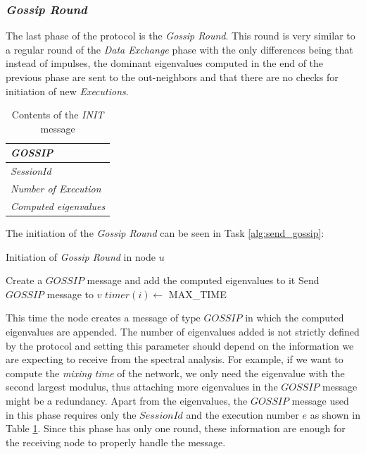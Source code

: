 \documentclass[a4paper,11pt,twoside]{report}
\begin{document}
\subsubsection*{\textit{Gossip Round}}

The last phase of the protocol is the \textit{Gossip Round}. This round is very similar to a regular round of the \textit{Data Exchange} phase with the only differences being that instead of impulses, the dominant eigenvalues computed in the end of the previous phase are sent to the out-neighbors and that there are no checks for initiation of new \textit{Executions}.

\begin{table}
	 \centering
	     	     \begin{tabular}{|l|}
	     	     	   	\hline
	     	     	   \textbf{\textit{GOSSIP}}\\
	     	     	   	\hline
	     	     	   	\hline
	     	     	   	 \textit{SessionId}\\
	     	     	     \textit{Number of Execution}\\
	     	     	     \textit{Computed eigenvalues}\\
	     	     	       \hline
	     	     	     	\end{tabular}
\caption{Contents of the \textit{INIT} message}
		     	   \label{table:gossip_msg}
\end{table}	

\noindent The initiation of the \textit{Gossip Round} can be seen in Task \ref{alg:send_gossip}:

\begin{algorithm}
 		\caption{Initiation of \textit{Gossip Round} in node $u$}
 		\label{alg:send_gossip}
 		\begin{algorithmic}[1]
 		\STATE Create a $GOSSIP$ message and add the computed eigenvalues to it
 		\STATE Send $GOSSIP$ message to $v$
 		\ENDFOR
 		\STATE $timer(i) \leftarrow$ MAX\_TIME
 		\ENDFOR
 		\end{algorithmic}
 	\end{algorithm}

This time the node creates a message of type $GOSSIP$ in which the computed eigenvalues are appended. The number of eigenvalues added is not strictly defined by the protocol and setting this parameter should depend on the information we are expecting to receive from the spectral analysis. For example, if we want to compute the \textit{mixing time} of the network, we only need the eigenvalue with the second largest modulus, thus attaching more eigenvalues in the $GOSSIP$ message might be a redundancy. Apart from the eigenvalues, the $GOSSIP$ message used in this phase requires only the $SessionId$ and the execution number $e$ as shown in Table \ref{table:gossip_msg}. Since this phase has only one round, these information are enough for the receiving node to properly handle the message.\\
\end{document}
